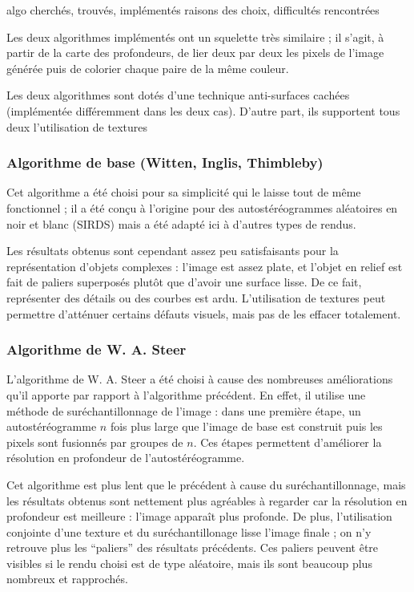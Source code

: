 algo cherchés, trouvés, implémentés
  raisons des choix, difficultés rencontrées

  Les deux algorithmes implémentés ont un squelette très similaire ; il s'agit, à partir de la carte des profondeurs, de lier deux par deux les pixels de l'image générée puis de colorier chaque paire de la même couleur.

  Les deux algorithmes sont dotés d'une technique anti-surfaces cachées (implémentée différemment dans les deux cas). D'autre part, ils supportent tous deux l'utilisation de textures 
  
  \subsubsection{Algorithme de base (Witten, Inglis, Thimbleby)}

  Cet algorithme a été choisi pour sa simplicité qui le laisse tout de même fonctionnel ; il a été conçu à l'origine pour des autostéréogrammes aléatoires en noir et blanc (SIRDS) mais a été adapté ici à d'autres types de rendus.

  Les résultats obtenus sont cependant assez peu satisfaisants pour la représentation d'objets complexes : l'image est assez plate, et l'objet en relief est fait de paliers superposés plutôt que d'avoir une surface lisse. De ce fait, représenter des détails ou des courbes est ardu. L'utilisation de textures peut permettre d'atténuer certains défauts visuels, mais pas de les effacer totalement.

  \subsubsection{Algorithme de W. A. Steer}
  
  L'algorithme de W. A. Steer a été choisi à cause des nombreuses améliorations qu'il apporte par rapport à l'algorithme précédent. En effet, il utilise une méthode de suréchantillonnage de l'image : dans une première étape, un autostéréogramme $n$ fois plus large que l'image de base est construit puis les pixels sont fusionnés par groupes de $n$. Ces étapes permettent d'améliorer la résolution en profondeur de l'autostéréogramme.
  
  Cet algorithme est plus lent que le précédent à cause du suréchantillonnage, mais les résultats obtenus sont nettement plus agréables à regarder car la résolution en profondeur est meilleure : l'image apparaît plus profonde. De plus, l'utilisation conjointe d'une texture et du suréchantillonage lisse l'image finale ; on n'y retrouve plus les ``paliers'' des résultats précédents. Ces paliers peuvent être visibles si le rendu choisi est de type aléatoire, mais ils sont beaucoup plus nombreux et rapprochés.
